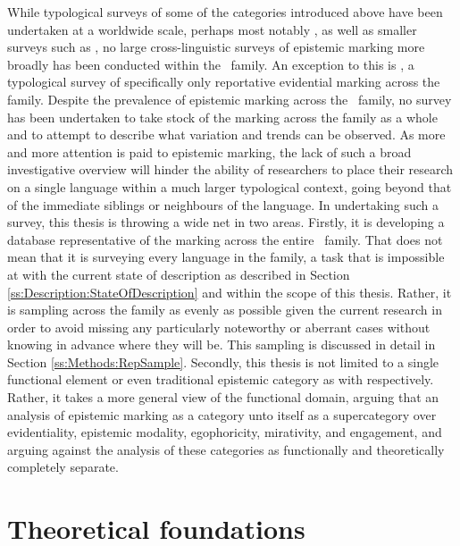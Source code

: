 While typological surveys of some of the categories introduced above have been undertaken at a worldwide scale, perhaps most notably , as well as smaller surveys such as , no large cross-linguistic surveys of epistemic marking more broadly has been conducted within the \lfam\ family. An exception to this is , a typological survey of specifically only reportative evidential marking across the family. Despite the prevalence of epistemic marking across the \lfam\ family, no survey has been undertaken to take stock of the marking across the family as a whole and to attempt to describe what variation and trends can be observed. As more and more attention is paid to epistemic marking, the lack of such a broad investigative overview will hinder the ability of researchers to place their research on a single language within a much larger typological context, going beyond that of the immediate siblings or neighbours of the language. In undertaking such a survey, this thesis is throwing a wide net in two areas. Firstly, it is developing a database representative of the marking across the entire \lfam\ family. That does not mean that it is surveying every language in the family, a task that is impossible at with the current state of description as described in Section \ref{ss:Description:StateOfDescription} and within the scope of this thesis. Rather, it is sampling across the family as evenly as possible given the current research in order to avoid missing any particularly noteworthy or aberrant cases without knowing in advance where they will be. This sampling is discussed in detail in Section \ref{ss:Methods:RepSample}. Secondly, this thesis is not limited to a single functional element or even traditional epistemic category as with  respectively. Rather, it takes a more general view of the functional domain, arguing that an analysis of epistemic marking as a category unto itself as a supercategory over evidentiality, epistemic modality, egophoricity, mirativity, and engagement, and arguing against the analysis of these categories as functionally and theoretically completely separate.



\chapter{Theoretical foundations}\label{c:Foundations}
